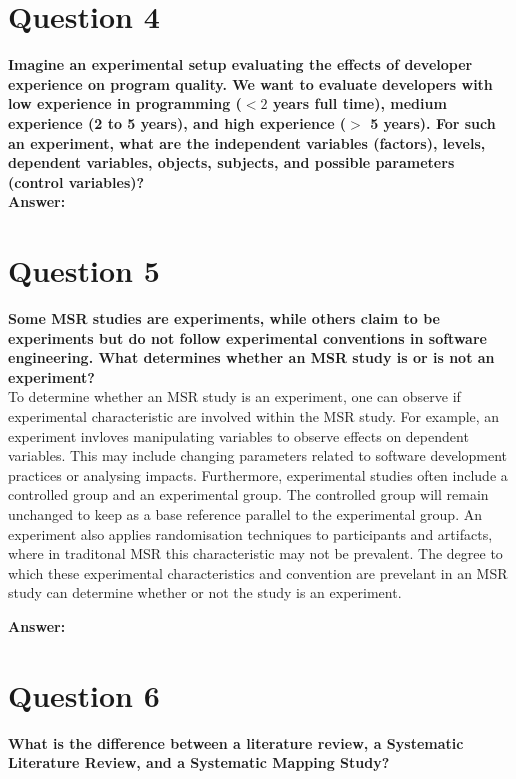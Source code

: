 \documentclass[conference]{IEEEtran}
\begin{document}
\section{Question 4}

\textbf{Imagine an experimental setup evaluating the effects of developer experience on program quality. We want to evaluate developers with low experience in programming ($<2$ years full time), medium experience (2 to 5 years), and high experience ($>$ 5 years). For such an experiment, what are the independent variables (factors), levels, dependent variables, objects, subjects, and possible parameters (control variables)?}\\

\textbf{Answer:}

\section{Question 5}

\textbf{Some MSR studies are experiments, while others claim to be experiments but do not follow experimental conventions in software engineering. What determines whether an MSR study is or is not an experiment?}\\
To determine whether an MSR study is an experiment, one can observe if experimental characteristic are involved within the MSR study. For example, an experiment invloves manipulating variables to observe effects on dependent variables. This may include changing parameters related to software development practices or analysing impacts. Furthermore, experimental studies often include a controlled group and an experimental group. The controlled group will remain unchanged to keep as a base reference parallel to the experimental group. An experiment also applies randomisation techniques to participants and artifacts, where in traditonal MSR this characteristic may not be prevalent. The degree to which these experimental characteristics and convention are prevelant in an MSR study can determine whether or not the study is an experiment.

\textbf{Answer:}

\section{Question 6}

\textbf{What is the difference between a literature review, a Systematic Literature Review, and a Systematic Mapping Study?}\\
\end{document}
